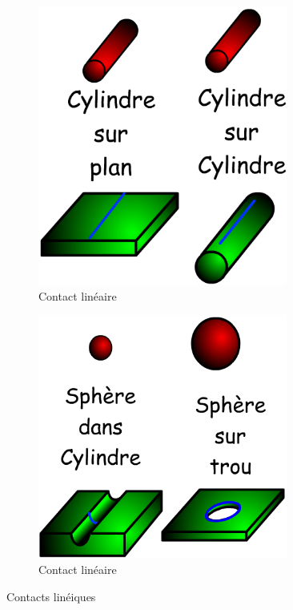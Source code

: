 \documentclass[10pt,fleqn]{article} %
\begin{document}
\begin{figure}[h]
  \begin{subfigure}[b]{0.5\textwidth}
    \centering
    \includegraphics[width=0.9\textwidth,height=.2\textheight,keepaspectratio]{images/lineaire_rectiligne}
    \caption{Contact linéaire }
  \end{subfigure}\hfill
  \begin{subfigure}[b]{0.5\textwidth}
    \centering
    \includegraphics[width=0.9\textwidth,height=.2\textheight,keepaspectratio]{images/lineaire_annulaire}
    \caption{Contact linéaire }
  \end{subfigure}\hfill
  \caption{Contacts linéiques}
  \label{fig:surfacique}
\end{figure}
\end{document}
